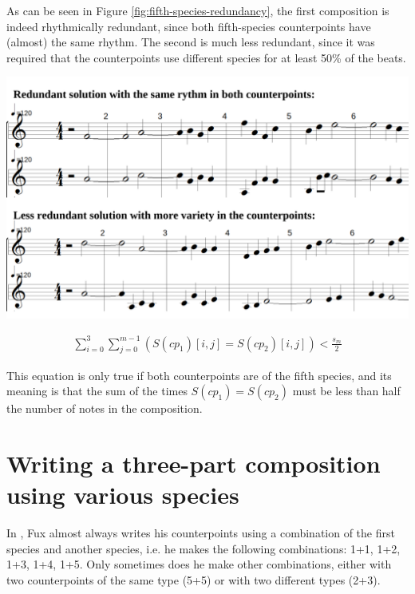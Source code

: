 \noindent
\begin{minipage}{0.37\textwidth}
    As can be seen in Figure \ref{fig:fifth-species-redundancy}, the first composition is indeed rhythmically redundant, since both fifth-species counterpoints have (almost) the same rhythm. The second is much less redundant, since it was required that the counterpoints use different species for at least 50\% of the beats.
    \end{minipage}
    \hfill
    \begin{minipage}{0.6\textwidth}
      \centering
      \includegraphics[width=\textwidth]{Images/fifth-species-redundancy.png}
      \label{fig:fifth-species-redundancy}
\end{minipage}
\vspace{.5cm}


\begin{equation}
\begin{aligned}
\sum_{i=0}^{3} \sum_{j=0}^{m-1} (S(cp_1)[i,j] = S(cp_2)[i,j]) < \frac{s_m}{2}
\end{aligned}
\end{equation}

This equation is only true if both counterpoints are of the fifth species, and its meaning is that the sum of the times $S(cp_1)=S(cp_2)$ must be less than half the number of notes in the composition.

\section{Writing a three-part composition using various species}
In \gap, Fux almost always writes his counterpoints using a combination of the first species and another species, i.e. he makes the following combinations: 1+1, 1+2, 1+3, 1+4, 1+5. Only sometimes does he make other combinations, either with two counterpoints of the same type (5+5) or with two different types (2+3).

